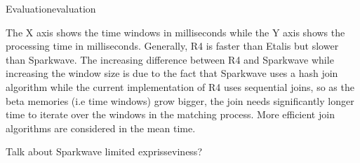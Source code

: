 \begin{nestedsection}{Evaluation}{evaluation}
\begin{figure}
	\end{figure}
	The X axis shows the time windows in milliseconds while the Y axis shows the processing time in milliseconds.
	Generally, R4 is faster than Etalis but slower than Sparkwave.
	The increasing difference between R4 and Sparkwave while increasing the window size is due to the fact that Sparkwave uses a hash join algorithm while the current implementation of R4 uses sequential joins, so as the beta memories (i.e time windows) grow bigger, the join needs significantly longer time to iterate over the windows in the matching process.
	More efficient join algorithms are considered in the mean time.

	Talk about Sparkwave limited exprisseviness?

\end{nestedsection}
